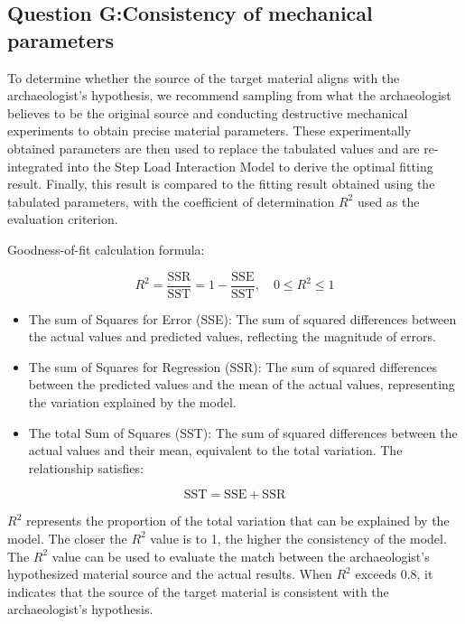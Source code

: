 \documentclass{mcmthesis}
\begin{document}
\subsection{Question G:Consistency of mechanical parameters}

To determine whether the source of the target material aligns with the archaeologist's hypothesis, we recommend sampling from what the archaeologist believes to be the original source and conducting destructive mechanical experiments to obtain precise material parameters. These experimentally obtained parameters are then used to replace the tabulated values and are re-integrated into the Step Load Interaction Model to derive the optimal fitting result. Finally, this result is compared to the fitting result obtained using the tabulated parameters, with the coefficient of determination $R^2$ used as the evaluation criterion.


Goodness-of-fit calculation formula:


\[R^2 = \frac{\text{SSR}}{\text{SST}} = 1 - \frac{\text{SSE}}{\text{SST}}, \quad 0 \leq R^2 \leq 1 \]

\begin{itemize} 

\item The sum of Squares for Error (SSE): The sum of squared differences between the actual values and predicted values, reflecting the magnitude of errors. 

\item The sum of Squares for Regression (SSR): The sum of squared differences between the predicted values and the mean of the actual values, representing the variation explained by the model. 

\item The total Sum of Squares (SST): The sum of squared differences between the actual values and their mean, equivalent to the total variation. The relationship satisfies: 
\end{itemize}



\[\text{SST} = \text{SSE} + \text{SSR}\]

$R^2$ represents the proportion of the total variation that can be explained by the model. The closer the $R^2$ value is to 1, the higher the consistency of the model. The $R^2$ value can be used to evaluate the match between the archaeologist's hypothesized material source and the actual results. When $R^2$ exceeds 0.8, it indicates that the source of the target material is consistent with the archaeologist's hypothesis.
\end{document}
